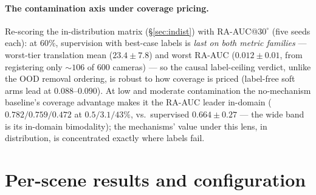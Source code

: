 \documentclass{article}
\begin{document}
\paragraph{The contamination axis under coverage pricing.} Re-scoring the
in-distribution matrix (\S\ref{sec:indist}) with RA-AUC@$30^{\circ}$ (five seeds
each): at $60\%$, supervision with best-case labels is \emph{last on both metric
families} --- worst-tier translation mean ($23.4\pm7.8$) and worst RA-AUC
($0.012\pm0.01$, from registering only ${\sim}106$ of $600$ cameras) --- so the
causal label-ceiling verdict, unlike the OOD removal ordering, is robust to how
coverage is priced (label-free soft arms lead at $0.088$--$0.090$). At low and
moderate contamination the no-mechanism baseline's coverage advantage makes it the
RA-AUC leader in-domain ($0.782/0.759/0.472$ at $0.5/3.1/43\%$, vs.\ supervised
$0.664\pm0.27$ --- the wide band is its in-domain bimodality); the mechanisms'
value under this lens, in distribution, is concentrated exactly where labels
fail.

\section{Per-scene results and configuration}\label{app:perscene}
\end{document}
